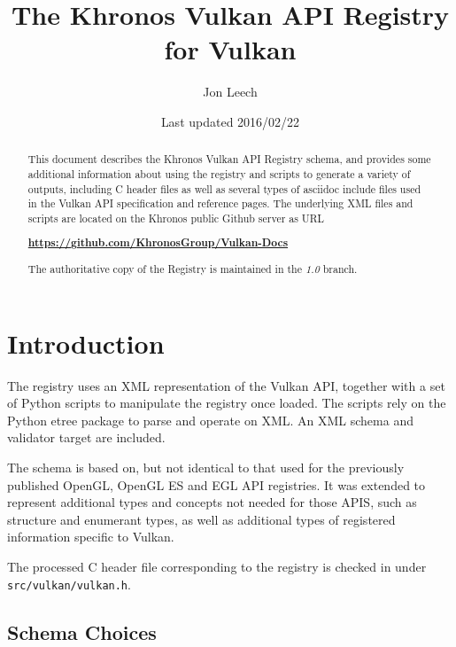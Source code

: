 \documentclass{article}
\begin{document}
\title{The Khronos Vulkan API Registry for Vulkan}
\author{Jon Leech}
\date{Last updated 2016/02/22}
\maketitle

\begin{abstract}

This document describes the Khronos Vulkan API Registry schema, and provides
some additional information about using the registry and scripts to generate
a variety of outputs, including C header files as well as several types of
asciidoc include files used in the Vulkan API specification and reference
pages. The underlying XML files and scripts are located on the Khronos
public Github server as URL

\begin{center}
{\bf \href{https://github.com/KhronosGroup/Vulkan-Docs}
          {https://github.com/KhronosGroup/Vulkan-Docs}}
\end{center}

The authoritative copy of the Registry is maintained in the {\em 1.0}
branch.

\end{abstract}

\tableofcontents

\section{Introduction}

The registry uses an XML representation of the Vulkan API, together with a
set of Python scripts to manipulate the registry once loaded. The scripts
rely on the Python etree package to parse and operate on XML. An XML schema
and validator target are included.

The schema is based on, but not identical to that used for the previously
published OpenGL, OpenGL ES and EGL API registries. It was extended to
represent additional types and concepts not needed for those APIS, such as
structure and enumerant types, as well as additional types
of registered information specific to Vulkan.

The processed C header file corresponding to the registry is checked in
under {\tt src/vulkan/vulkan.h}.


\subsection{Schema Choices}
\end{document}
